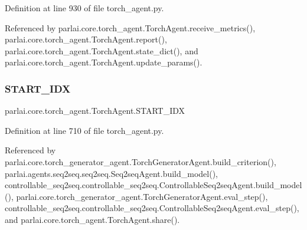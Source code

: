 Definition at line 930 of file torch\+\_\+agent.\+py.



Referenced by parlai.\+core.\+torch\+\_\+agent.\+Torch\+Agent.\+receive\+\_\+metrics(), parlai.\+core.\+torch\+\_\+agent.\+Torch\+Agent.\+report(), parlai.\+core.\+torch\+\_\+agent.\+Torch\+Agent.\+state\+\_\+dict(), and parlai.\+core.\+torch\+\_\+agent.\+Torch\+Agent.\+update\+\_\+params().

\mbox{\label{classparlai_1_1core_1_1torch__agent_1_1TorchAgent_a2018afae9938937f80b61475314012cd}} 
\subsubsection{\texorpdfstring{S\+T\+A\+R\+T\+\_\+\+I\+DX}{START\_IDX}}
{\footnotesize\ttfamily parlai.\+core.\+torch\+\_\+agent.\+Torch\+Agent.\+S\+T\+A\+R\+T\+\_\+\+I\+DX}



Definition at line 710 of file torch\+\_\+agent.\+py.



Referenced by parlai.\+core.\+torch\+\_\+generator\+\_\+agent.\+Torch\+Generator\+Agent.\+build\+\_\+criterion(), parlai.\+agents.\+seq2seq.\+seq2seq.\+Seq2seq\+Agent.\+build\+\_\+model(), controllable\+\_\+seq2seq.\+controllable\+\_\+seq2seq.\+Controllable\+Seq2seq\+Agent.\+build\+\_\+model(), parlai.\+core.\+torch\+\_\+generator\+\_\+agent.\+Torch\+Generator\+Agent.\+eval\+\_\+step(), controllable\+\_\+seq2seq.\+controllable\+\_\+seq2seq.\+Controllable\+Seq2seq\+Agent.\+eval\+\_\+step(), and parlai.\+core.\+torch\+\_\+agent.\+Torch\+Agent.\+share().

\mbox{\label{classparlai_1_1core_1_1torch__agent_1_1TorchAgent_ae3a69ecb5f20ce4f8a09c05c5f6f4376}} 
